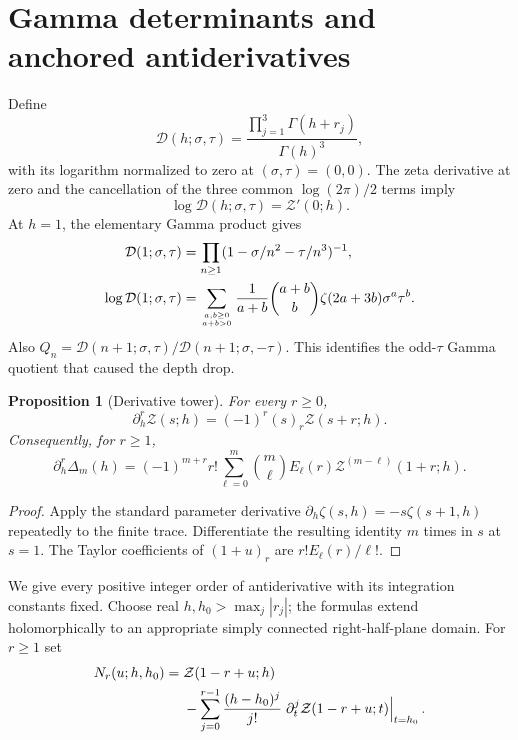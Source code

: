 \documentclass[11pt]{article}
\numberwithin{equation}{section}
\newtheorem{proposition}[theorem]{Proposition}
\theoremstyle{definition}\newtheorem{definition}[theorem]{Definition}
\theoremstyle{remark}\newtheorem{remark}[theorem]{Remark}
\newcommand{\Ztr}{\mathcal Z}
\newcommand{\Dtr}{\mathcal D}
\begin{document}
\section{Gamma determinants and anchored antiderivatives}
\label{ct:sec:primitives}
Define
\begin{equation}\label{ct:eq:D}
 \Dtr(h;\sigma,\tau)=\frac{\prod_{j=1}^3\Gamma(h+r_j)}{\Gamma(h)^3},
\end{equation}
with its logarithm normalized to zero at $(\sigma,\tau)=(0,0)$.
The zeta derivative at zero and the cancellation of the three common
$\log(2\pi)/2$ terms imply
\begin{equation}\label{ct:eq:determinant}
 \log\Dtr(h;\sigma,\tau)=\Ztr'(0;h).
\end{equation}
At $h=1$, the elementary Gamma product gives
\begin{align}
 \Dtr(1;\sigma,\tau)
       &=\prod_{n\ge1}(1-\sigma/n^2-\tau/n^3)^{-1},\label{ct:eq:D-product}\\
 \log\Dtr(1;\sigma,\tau)
       &=\sum_{a,b\ge0\atop a+b>0}
           \frac1{a+b}\binom{a+b}{b}\zeta(2a+3b)\sigma^a\tau^b.
            \label{ct:eq:D-series}
\end{align}
Also $Q_n=\Dtr(n+1;\sigma,\tau)/\Dtr(n+1;\sigma,-\tau)$.
This identifies the odd-$\tau$ Gamma quotient that caused the depth drop.

\begin{proposition}[Derivative tower]\label{ct:prop:derivatives}
For every $r\ge0$,
\begin{equation}\label{ct:eq:trace-derivative}
 \partial_h^r\Ztr(s;h)=(-1)^r(s)_r\Ztr(s+r;h).
\end{equation}
Consequently, for $r\ge1$,
\begin{equation}\label{ct:eq:stieltjes-derivative}
 \partial_h^r\Delta_m(h)=(-1)^{m+r}r!
       \sum_{\ell=0}^m\binom m\ell E_\ell(r)
                     \Ztr^{(m-\ell)}(1+r;h).
\end{equation}
\end{proposition}
\begin{proof}
Apply the standard parameter derivative
$\partial_h\zeta(s,h)=-s\zeta(s+1,h)$ repeatedly to the finite trace.
Differentiate the resulting identity $m$ times in $s$ at $s=1$.
The Taylor coefficients of $(1+u)_r$ are $r!E_\ell(r)/\ell!$.
\end{proof}

We give every positive integer order of antiderivative with its integration
constants fixed. Choose real $h,h_0>\max_j|r_j|$; the formulas extend
holomorphically to an appropriate simply connected right-half-plane domain.
For $r\ge1$ set
\begin{align}
 N_r(u;h,h_0)={}&\Ztr(1-r+u;h)\notag\\
  &-\sum_{j=0}^{r-1}\frac{(h-h_0)^j}{j!}
         \left.\partial_t^j\Ztr(1-r+u;t)\right|_{t=h_0}.
 \label{ct:eq:N-primitive}
\end{align}
\end{document}
